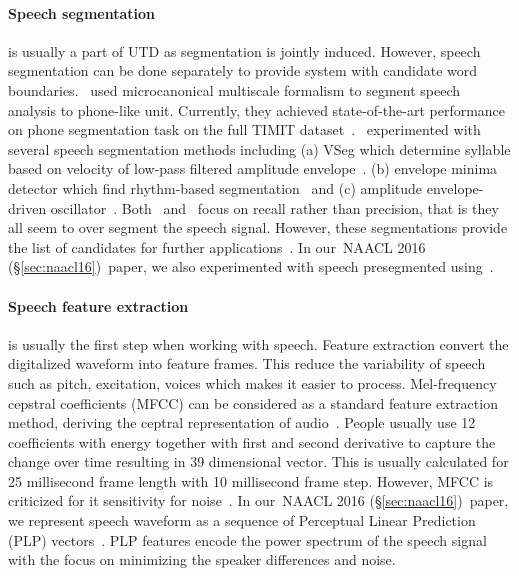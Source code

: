 \documentclass[12pt,twoside,final,hidelinks]{ltthesis}
\theoremstyle{definition}
\newcommand\naaclvi{NAACL 2016 (\S\ref{sec:naacl16})}
\begin{document}
\paragraph{Speech segmentation} is usually a part of UTD as segmentation is jointly induced. However, speech segmentation can be done separately to provide system 
with candidate word boundaries.~ used microcanonical multiscale formalism to segment speech analysis to phone-like 
unit. Currently, they achieved state-of-the-art performance on phone segmentation task on the full TIMIT dataset~\cite{timit}.~ experimented 
with several speech segmentation methods including (a) VSeg which determine syllable based on velocity of low-pass filtered amplitude envelope~\cite{nuimeprn1268}. 
(b) envelope minima detector which find rhythm-based segmentation~\cite{villing2006performance} and (c) amplitude envelope-driven 
oscillator~\cite{ghitza2011linking}. Both~ and~ focus on recall rather than precision, that is they 
all seem to over segment the speech signal. However, these segmentations provide the list of candidates for further applications~\cite{KamperJG16a}. In our~\naaclvi\ paper, we also experimented with speech presegmented using~.

\paragraph{Speech feature extraction} is usually the first step when working with speech. Feature extraction convert the digitalized waveform into feature frames. 
This reduce the variability of speech such as pitch, excitation, voices which makes it easier to process. Mel-frequency cepstral coefficients (MFCC) can be 
considered as a standard feature extraction method, deriving the ceptral representation of audio~\cite{Fang:2001:CDI:569577.569587}. People usually use 12 
coefficients with energy together with first and second derivative to capture the change over time resulting in 39 dimensional vector. This is usually calculated for 
25 millisecond frame length with 10 millisecond frame step. However, MFCC is criticized for it sensitivity for noise~\cite{DBLP:journals/corr/abs-1305-1145}. 
In our~\naaclvi\ paper, we represent speech waveform as a sequence of Perceptual Linear Prediction (PLP) vectors~\cite{Hermansky90plpspeech}. PLP features encode the 
power spectrum of the speech signal with the focus on minimizing the speaker differences and noise. 
\end{document}
